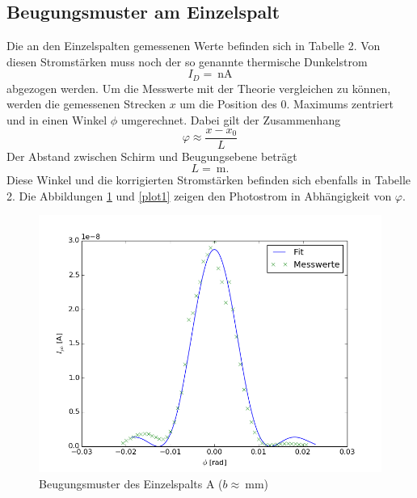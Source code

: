 \documentclass[11pt,ngerman,a4paper]{article}
\begin{document}
\subsection{Beugungsmuster am Einzelspalt}

Die an den Einzelspalten gemessenen Werte befinden sich in Tabelle 2. Von diesen Stromstärken muss noch der so genannte thermische Dunkelstrom 
\[
I_D = \SI{}{\nano\ampere}
\]
abgezogen werden. Um die Messwerte mit der Theorie vergleichen zu können, werden die gemessenen Strecken $x$ um die Position des 0. Maximums zentriert und in einen Winkel $\phi$ umgerechnet. Dabei gilt der Zusammenhang
\[
\varphi \approx \frac{x-x_0}{L}
\] 
Der Abstand zwischen Schirm und Beugungsebene beträgt
\[
L = \SI{}{\meter} \mathrm{.}
\]
Diese Winkel und die korrigierten Stromstärken befinden sich ebenfalls in Tabelle 2. Die Abbildungen \ref{plot0} und  \ref{plot1} zeigen den Photostrom in Abhängigkeit von $\varphi$.
\begin{figure}[H]
\centering
\includegraphics[scale=0.8]{plot0.png}
\caption{Beugungsmuster des Einzelspalts A ($b \approx \SI{}{\milli\meter}$)}
\label{plot0}
\end{figure}
\end{document}
